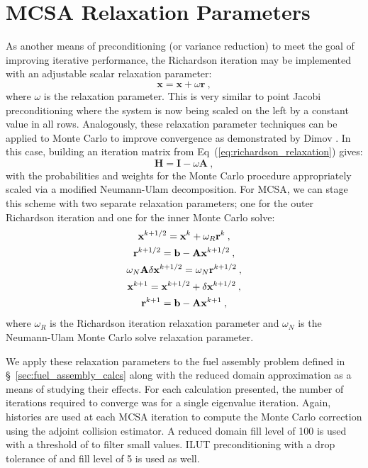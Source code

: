 \chapter{MCSA Relaxation Parameters}
\label{chap:spn_mcsa_relaxation}
As another means of preconditioning (or variance reduction) to meet
the goal of improving iterative performance, the Richardson iteration
may be implemented with an adjustable scalar relaxation parameter:
\begin{equation}
  \mathbf{x} = \mathbf{x} + \omega \mathbf{r}\:,
  \label{eq:richardson_relaxation}
\end{equation}
where $\omega$ is the relaxation parameter. This is very similar to
point Jacobi preconditioning where the system is now being scaled on
the left by a constant value in all rows. Analogously, these
relaxation parameter techniques can be applied to Monte Carlo to
improve convergence as demonstrated by Dimov \cite{dimov_new_1998}. In
this case, building an iteration matrix from
Eq~(\ref{eq:richardson_relaxation}) gives:
\begin{equation}
  \mathbf{H} = \mathbf{I} - \omega \mathbf{A}\:,
  \label{eq:relaxed_iteration_matrix}
\end{equation}
with the probabilities and weights for the Monte Carlo procedure
appropriately scaled via a modified Neumann-Ulam decomposition. For
MCSA, we can stage this scheme with two separate relaxation
parameters; one for the outer Richardson iteration and one for the
inner Monte Carlo solve:
\begin{subequations}
  \begin{gather}
    \mathbf{x}^{k+1/2} = \mathbf{x}^k + \omega_R \mathbf{r}^k\:,\\ \mathbf{r}^{k+1/2}
    = \mathbf{b} -
    \mathbf{A}\mathbf{x}^{k+1/2}\:,\\ \omega_N\mathbf{A}\delta\mathbf{x}^{k+1/2} =
    \omega_N\mathbf{r}^{k+1/2}\:,\\ \mathbf{x}^{k+1} = \mathbf{x}^{k+1/2} + \delta
    \mathbf{x}^{k+1/2}\:,\\ \mathbf{r}^{k+1} = \mathbf{b} - \mathbf{A}\mathbf{x}^{k+1}\:,
  \end{gather}
  \label{eq:mcsa_relaxed}
\end{subequations}
where $\omega_R$ is the Richardson iteration relaxation parameter and
$\omega_N$ is the Neumann-Ulam Monte Carlo solve relaxation parameter.

We apply these relaxation parameters to the fuel assembly problem
defined in \S~\ref{sec:fuel_assembly_calcs} along with the reduced
domain approximation as a means of studying their effects. For each
calculation presented, the number of iterations required to converge
was for a single eigenvalue iteration.  Again,  histories are
used at each MCSA iteration to compute the Monte Carlo correction
using the adjoint collision estimator. A reduced domain fill level of
100 is used with a threshold of  to filter small
values. ILUT preconditioning with a drop tolerance of  and
fill level of 5 is used as well.

